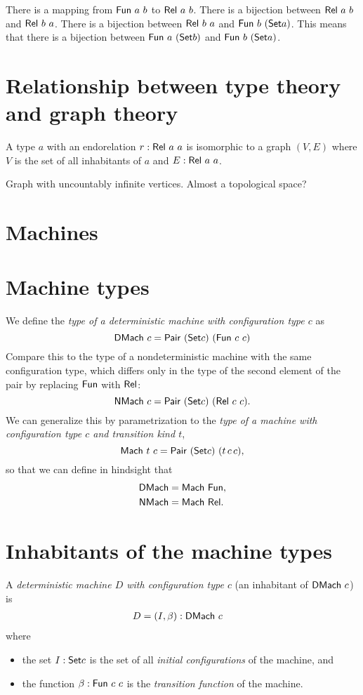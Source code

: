 There is a mapping from $\mathsf{Fun}~a~b$ to $\mathsf{Rel}~a~b$.
There is a bijection between $\mathsf{Rel}~a~b$ and $\mathsf{Rel}~b~a$.
There is a bijection between $\mathsf{Rel}~b~a$ and $\mathsf{Fun}~b~(\textsf{Set}{a})$.
This means that there is a bijection between $\mathsf{Fun}~a~(\textsf{Set}{b})$ and $\mathsf{Fun}~b~(\textsf{Set}{a})$.

\section{Relationship between type theory and graph theory}

A type $a$ with an endorelation $r : \mathsf{Rel}~a~a$
is isomorphic to a graph $(V, E)$
where $V$ is the set of all inhabitants of $a$
and $E : \mathsf{Rel}~a~a$.

Graph with uncountably infinite vertices.
Almost a topological space?

\section{Machines}

\section{Machine types}

We define the \emph{type of a deterministic machine with configuration type $c$} as
\[ \mathsf{DMach}~c = \mathsf{Pair}~(\textsf{Set}{c})~(\mathsf{Fun}~c~c) \]
Compare this to the type of a nondeterministic machine
with the same configuration type,
which differs only in the type of the second element of the pair
by replacing $\mathsf{Fun}$ with $\mathsf{Rel}$:
\[ \mathsf{NMach}~c = \mathsf{Pair}~(\textsf{Set}{c})~(\mathsf{Rel}~c~c). \]
We can generalize this by parametrization to
the \emph{type of a machine with configuration type $c$
and transition kind $t$},
\[
    \mathsf{Mach}~t~c = \mathsf{Pair}~(\textsf{Set}{c})~(t\,c\,c),
\]
so that we can define in hindsight that
\begin{align*}
       \mathsf{DMach} &= \mathsf{Mach}~\mathsf{Fun},
    \\
       \mathsf{NMach} &= \mathsf{Mach}~\mathsf{Rel}.
\end{align*}

\section{Inhabitants of the machine types}

A \emph{deterministic machine $D$ with configuration type $c$}
(an inhabitant of $\mathsf{DMach}~c$) is
\begin{align*}
    D &= (I,\beta) : \mathsf{DMach}~c
\end{align*}
where
\begin{itemize}
    \item the set $I : \textsf{Set}{c}$ is the set of all \emph{initial configurations} of the machine, and
    \item the function $\beta : \mathsf{Fun}~c~c$ is the \emph{transition function} of the machine.
\end{itemize}

